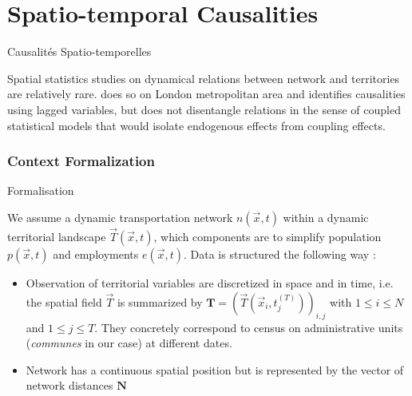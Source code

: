 

\newpage





\section[Spatio-temporal Causalities][Causalités Spatio-temporelles]{Spatio-temporal Causalities}{Causalités Spatio-temporelles}

Spatial statistics studies on dynamical relations between network and territories are relatively rare. \cite{levinson2008density} does so on London metropolitan area and identifies causalities using lagged variables, but does not disentangle relations in the sense of coupled statistical models that would isolate endogenous effects from coupling effects.




\subsubsection{Context Formalization}{Formalisation}



We assume a dynamic transportation network $n(\vec{x},t)$ within a dynamic territorial landscape $\vec{T}(\vec{x},t)$, which components are to simplify population $p(\vec{x},t)$ and employments $e(\vec{x},t)$. Data is structured the following way :
\begin{itemize}
\item Observation of territorial variables are discretized in space and in time, i.e. the spatial field $\vec{T}$ is summarized by $\mathbf{T} = \left(\vec{T}(\vec{x}_i,t_j^{(T)})\right)_{i,j}$ with $1\leq i \leq N$ and $1\leq j \leq T$. They concretely correspond to census on administrative units (\emph{communes} in our case) at different dates.
\item Network has a continuous spatial position but is represented by the vector of network distances $\mathbf{N}$ 
\end{itemize}



